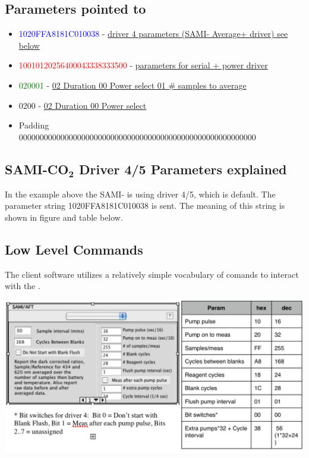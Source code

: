 \subsection*{Parameters pointed to}

\begin{itemize}
\item[]
\textcolor{blue}{1020FFA8181C010038} - \underline{driver 4 parameters (SAMI-\dioxide{} Average+
driver) see below}

\item[]
\textcolor{red}{10010120256400043338333500} - \underline{parameters for serial + power driver}

\item[]
\textcolor{green}{020001} - \underline{02 Duration 00 Power select 01 \# samples to average}

\item[]
0200 - \underline{02 Duration 00 Power select}

\item[]
Padding\\
000000000000000000000000000000000000000000000000000000000 
\end{itemize}


\subsection*{SAMI-CO$_\mathrm{\textbf{2}}$ Driver 4/5 Parameters explained}

In the example above the SAMI-\dioxide{} is using driver 4/5, which is default.
The parameter string 1020FFA8181C010038 is sent. The meaning of this
string is shown in figure and table below.


\subsection*{Low Level Commands}

The \instType{} client software utilizes a relatively simple
vocabulary of comands to interact with the \instType{}.

\includegraphics[width=\textwidth]{figs/Image1.png}


